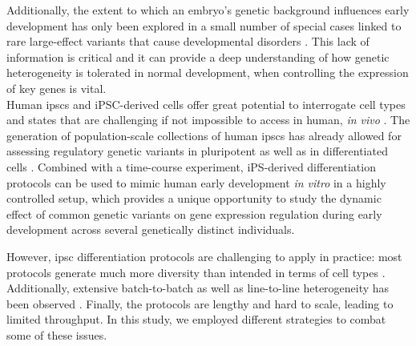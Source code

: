 Additionally, the extent to which an embryo’s genetic background influences early development has only been explored in a small number of special cases linked to rare large-effect variants that cause developmental disorders \cite{}.
This lack of information is critical and it can provide a deep understanding of how genetic heterogeneity is tolerated in normal development, when controlling the expression of key genes is vital.\\

Human \gls{ipsc}s and iPSC-derived cells offer great potential to interrogate cell types and states that are challenging if not impossible to access in human, \textit{in vivo} \cite{kilpinen2017common}.
The generation of population-scale collections of human \gls{ipsc}s \cite{kilpinen2017common, carcamo2017analysis} has already allowed for assessing regulatory genetic variants in pluripotent \cite{kilpinen2017common, carcamo2017analysis} as well as in differentiated cells \cite{schwartzentruber2018molecular, alasoo2018shared, pashos2017large}.
Combined with a time-course experiment, iPS-derived differentiation protocols can be used to mimic human early development \textit{in vitro} in a highly controlled setup, which provides a unique opportunity to study the dynamic effect of common genetic variants on gene expression regulation during early development across several genetically distinct individuals.

However, \gls{ipsc} differentiation protocols are challenging to apply in practice: most protocols generate much more diversity than intended in terms of cell types 
\cite{bock2011reference}.
Additionally, extensive batch-to-batch as well as line-to-line heterogeneity has been observed \cite{schwartzentruber2018molecular, carcamo2017analysis}. 
Finally, the protocols are lengthy and hard to scale, leading to limited throughput.
In this study, we employed different strategies to combat some of these issues.


